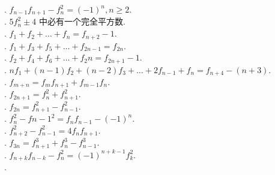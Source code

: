 \documentclass[10pt,column,letterpaper]{article}
\title{}
\author{}
\theoremstyle{mythmstyle}
\begin{document}
\large
{}. $f_{n-1}f_{n+1} - f_{n}^2 = (-1)^n, n \geq 2$.\\

. $5f_n^2 \pm 4$ 中必有一个完全平方数.\\

. $f_1 + f_2 + \dots + f_n = f_{n+2} - 1$.\\

. $f_1 + f_3 + f_5 + \dots + f_{2n-1} = f_{2n}$.\\

. $f_2 + f_4 +f_6 + \dots + f_2n = f_{2n+1} - 1$.\\

. $nf_1 + (n-1)f_2 + (n-2)f_3 + \dots + 2f_{n-1} + f_n = f_{n+4} - (n+3)$.\\

. $f_{m+n} = f_mf_{n+1} + f_{m-1}f_n$.\\

. $f_{2n+1} = f_n^2 + f_{n+1}^2$.\\

. $f_{2n} = f_{n+1}^2 - f_{n-1}^2$. \\

. $f_{n}^2 - f{n-1}^2 = f_nf_{n-1} - (-1)^n$.\\

. $f_{n+2}^2 - f_{n-1}^2 = 4f_nf_{n+1}$.\\

. $f_{3n} = f_{n+1}^{3} + f_n^3 - f_{n-1}^3$.\\

. $f_{n+k}f_{n-k} - f_n^2 = (-1)^{n+k-1}f_k^2$.\\

. 
\end{document}
